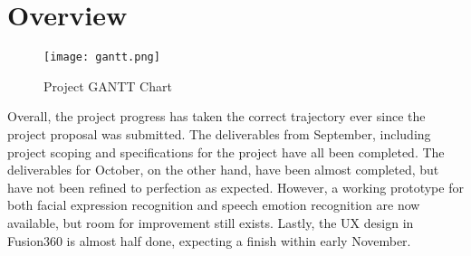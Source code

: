 \section{Overview}

\begin{figure}[ht]
    \centering
    \captionsetup{justification=centering}
    \texttt{[image: gantt.png]}
    \caption{Project GANTT Chart}
    \label{fig:gantt}
\end{figure}
Overall, the project progress has taken the correct trajectory ever since the project proposal was submitted. The deliverables from September, including project scoping and specifications for the project have all been completed. The deliverables for October, on the other hand, have been almost completed, but have not been refined to perfection as expected. However, a working prototype for both facial expression recognition and speech emotion recognition are now available, but room for improvement still exists. Lastly, the UX design in Fusion360 is almost half done, expecting a finish within early November.
